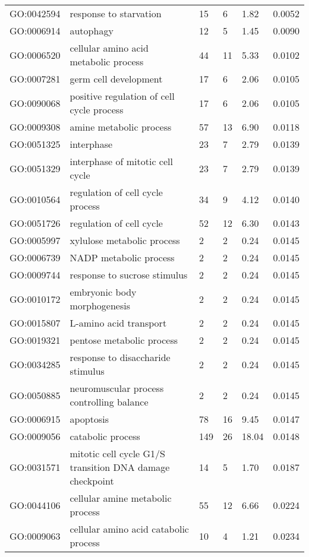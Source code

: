 \documentclass[10pt]{bmc_article}
\newenvironment{bmcformat}{\begin{raggedright}\baselineskip20pt\sloppy\setboolean{publ}{false}}{\end{raggedright}\baselineskip20pt\sloppy}
\begin{document}
\begin{bmcformat}
\begin{longtable}{lp{3cm}llll}
  GO:0042594 & response to starvation &  15 &   6 & 1.82 & 0.0052 \\ 
  GO:0006914 & autophagy &  12 &   5 & 1.45 & 0.0090 \\ 
  GO:0006520 & cellular amino acid metabolic process &  44 &  11 & 5.33 & 0.0102 \\ 
  GO:0007281 & germ cell development &  17 &   6 & 2.06 & 0.0105 \\ 
  GO:0090068 & positive regulation of cell cycle process &  17 &   6 & 2.06 & 0.0105 \\ 
  GO:0009308 & amine metabolic process &  57 &  13 & 6.90 & 0.0118 \\ 
  GO:0051325 & interphase &  23 &   7 & 2.79 & 0.0139 \\ 
  GO:0051329 & interphase of mitotic cell cycle &  23 &   7 & 2.79 & 0.0139 \\ 
  GO:0010564 & regulation of cell cycle process &  34 &   9 & 4.12 & 0.0140 \\ 
  GO:0051726 & regulation of cell cycle &  52 &  12 & 6.30 & 0.0143 \\ 
  GO:0005997 & xylulose metabolic process &   2 &   2 & 0.24 & 0.0145 \\ 
  GO:0006739 & NADP metabolic process &   2 &   2 & 0.24 & 0.0145 \\ 
  GO:0009744 & response to sucrose stimulus &   2 &   2 & 0.24 & 0.0145 \\ 
  GO:0010172 & embryonic body morphogenesis &   2 &   2 & 0.24 & 0.0145 \\ 
  GO:0015807 & L-amino acid transport &   2 &   2 & 0.24 & 0.0145 \\ 
  GO:0019321 & pentose metabolic process &   2 &   2 & 0.24 & 0.0145 \\ 
  GO:0034285 & response to disaccharide stimulus &   2 &   2 & 0.24 & 0.0145 \\ 
  GO:0050885 & neuromuscular process controlling balance &   2 &   2 & 0.24 & 0.0145 \\ 
  GO:0006915 & apoptosis &  78 &  16 & 9.45 & 0.0147 \\ 
  GO:0009056 & catabolic process & 149 &  26 & 18.04 & 0.0148 \\ 
  GO:0031571 & mitotic cell cycle G1/S transition DNA damage checkpoint &  14 &   5 & 1.70 & 0.0187 \\ 
  GO:0044106 & cellular amine metabolic process &  55 &  12 & 6.66 & 0.0224 \\ 
  GO:0009063 & cellular amino acid catabolic process &  10 &   4 & 1.21 & 0.0234 \\ 

\end{longtable}
\end{bmcformat}
\end{document}
